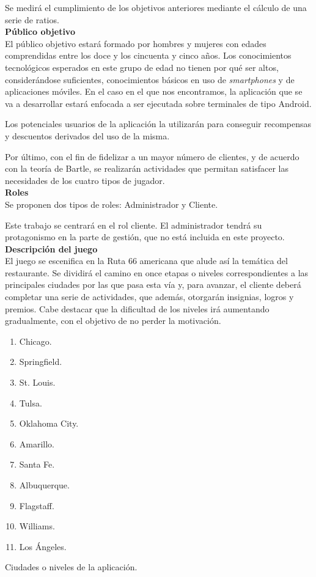 \documentclass[twoside]{report}
\begin{document}
Se medirá el cumplimiento de los objetivos anteriores mediante el cálculo de una serie de ratios.\\

\textbf{Público objetivo}\\

El público objetivo estará formado por hombres y mujeres con edades comprendidas entre los doce y los cincuenta y cinco años. 
Los conocimientos tecnológicos esperados en este grupo de edad no tienen por qué ser altos, considerándose suficientes, conocimientos básicos en uso de \textit{smartphones} y de aplicaciones móviles. En el caso en el que nos encontramos, la aplicación que se va a desarrollar estará enfocada a ser ejecutada sobre terminales de tipo Android.

Los potenciales usuarios de la aplicación la utilizarán para conseguir recompensas y descuentos derivados del uso de la misma.

Por último, con el fin de fidelizar a un mayor número de clientes, y de acuerdo con la \cite{iebsctj} teoría de Bartle\cite{iebsctj}, se realizarán actividades que permitan satisfacer las necesidades de los cuatro tipos de jugador.\\

\textbf{Roles}\\

Se proponen dos tipos de roles: Administrador y Cliente.

Este trabajo se centrará en el rol cliente. El administrador tendrá su protagonismo en la parte de gestión, que no está incluida en este proyecto.\\

\textbf{Descripción del juego}\\

El juego se escenifica en la Ruta 66 americana que alude así la temática del restaurante. Se dividirá el camino en once etapas o niveles correspondientes a las principales ciudades por las que pasa esta vía y, para avanzar, el cliente deberá completar una serie de actividades, que además, otorgarán insignias, logros y premios. Cabe destacar que la dificultad de los niveles irá aumentando gradualmente, con el objetivo de no perder la motivación.

\begin{table}[H]
\begin{multicols}{4}
\begin{enumerate}
\item Chicago.
\item Springfield.
\item St. Louis.
\item Tulsa.
\item Oklahoma City.
\item Amarillo.
\item Santa Fe.
\item Albuquerque.
\item Flagstaff.
\item Williams.
\item Los Ángeles.
\end{enumerate}
\end{multicols}
\caption{Ciudades o niveles de la aplicación.}
\end{table}
\end{document}
